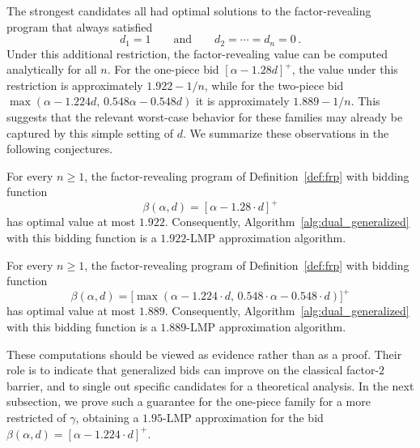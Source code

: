 
The strongest candidates all had optimal solutions to the factor-revealing program that always satisfied
\begin{equation*}
    d_1 = 1
    \qquad\text{and}\qquad
    d_2 = \cdots = d_n = 0\,.
\end{equation*}
Under this additional restriction, the factor-revealing value can be computed analytically for all $n$. For the one-piece bid $[\alpha - 1.28d]^+$, the value under this restriction is approximately $1.922 - 1/n$, while for the two-piece bid $\max(\alpha - 1.224d,\, 0.548\alpha - 0.548d)$ it is approximately $1.889 - 1/n$. This suggests that the relevant worst-case behavior for these families may already be captured by this simple setting of $d$. We summarize these observations in the following conjectures. 

\begin{conjecture}
\label{conj:one-piece-192}
For every $n \ge 1$, the factor-revealing program of Definition~\ref{def:frp} with bidding function
\begin{equation*}
\beta(\alpha,d) = [\alpha - 1.28\cdot d]^+
\end{equation*}
has optimal value at most $1.922$. Consequently, Algorithm~\ref{alg:dual_generalized} with this bidding function is a $1.922$-LMP approximation algorithm. 
\end{conjecture}

\begin{conjecture}
\label{conj:two-piece-189}
For every $n \ge 1$, the factor-revealing program of Definition~\ref{def:frp} with bidding function
\begin{equation*}
\beta(\alpha,d) = \bigl[\max(\alpha - 1.224\cdot d,\, 0.548\cdot \alpha - 0.548\cdot d)\bigr]^+
\end{equation*}
has optimal value at most $1.889$. Consequently, Algorithm~\ref{alg:dual_generalized} with this bidding function is a $1.889$-LMP approximation algorithm.
\end{conjecture}

These computations should be viewed as evidence rather than as a proof. Their role is to indicate that generalized bids can improve on the classical factor-$2$ barrier, and to single out specific candidates for a theoretical analysis. In the next subsection, we prove such a guarantee for the one-piece family for a more restricted of $\gamma$, obtaining a $1.95$-LMP approximation for the bid $\beta(\alpha,d) = [\alpha - 1.224\cdot d]^+$.

